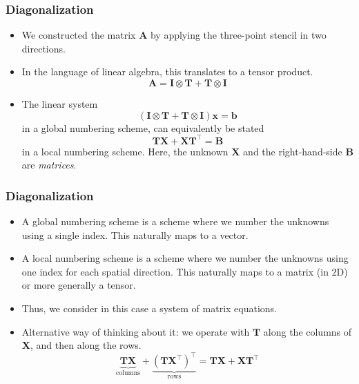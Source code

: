 \begin{frame}
  \frametitle{Diagonalization}
  \begin{itemize}
  \item We constructed the matrix $\bm A$ by applying the three-point stencil in
    two directions.
  \item In the language of linear algebra, this translates to a tensor product.
    \[ \bm A = \bm I \otimes \bm T + \bm T \otimes \bm I \]
  \item The linear system
    \[ \left( \bm I \otimes \bm T + \bm T \otimes \bm I \right) \bm x = \bm b \]
    in a global numbering scheme, can equivalently be stated
    \[ \bm T \bm X + \bm X \bm T^\intercal = \bm B \]
    in a local numbering scheme. Here, the unknown $\bm X$ and the
    right-hand-side $\bm B$ are \emph{matrices}.
  \end{itemize}
\end{frame}

\begin{frame}
  \frametitle{Diagonalization}
  \begin{itemize}
  \item A global numbering scheme is a scheme where we number the unknowns using
    a single index. This naturally maps to a vector.
  \item A local numbering scheme is a scheme where we number the unknowns using
    one index for each spatial direction. This naturally maps to a matrix (in
    2D) or more generally a tensor.
  \item Thus, we consider in this case a system of matrix equations.
  \item Alternative way of thinking about it: we operate with $\bm T$ along the
    columns of $\bm X$, and then along the rows.
    \[
      \underbrace{\bm T \bm X}_{\text{columns}} +
      \underbrace{\left( \bm T \bm X^\intercal \right)^\intercal}_{\text{rows}}
      = \bm T \bm X + \bm X \bm T^\intercal
    \]
  \end{itemize}
\end{frame}

